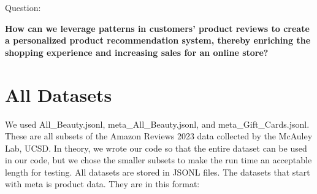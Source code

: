 \documentclass[fontsize=11pt]{article}
\begin{document}
\vspace{\baselineskip}
\noindent Question:

\textbf{How can we leverage patterns in customers' product reviews to create a personalized product recommendation system, thereby enriching the shopping experience and increasing sales for an online store?}

\section*{All Datasets}
We used All\_Beauty.jsonl, meta\_All\_Beauty.jsonl, and meta\_Gift\_Cards.jsonl.
These are all subsets of the Amazon Reviews 2023 data collected by the McAuley Lab, UCSD. In theory, we wrote our code so that the entire dataset can be used in our code, but we chose the smaller subsets to make the run time an acceptable length for testing. All datasets are stored in JSONL files.
The datasets that start with meta is product data. They are in this format:
\end{document}
